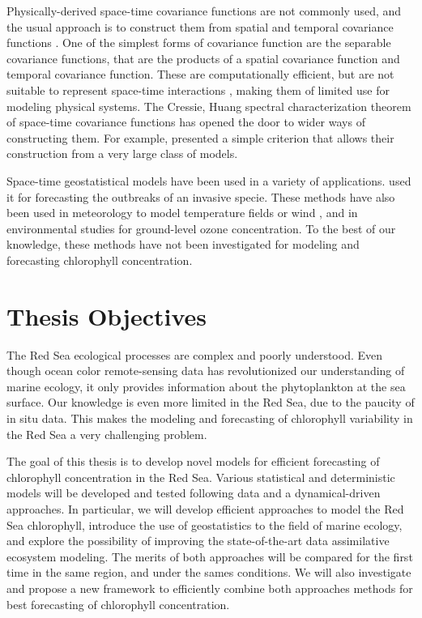 Physically-derived space-time covariance functions are not commonly used, and
the usual approach is to construct them from spatial and temporal covariance
functions \citep{Gneiting2010}. One of the simplest forms of covariance
function are the separable covariance functions, that are the products of a
spatial covariance function and temporal covariance function. These are
computationally efficient, but are not suitable to represent space-time
interactions \citep{Cressie1999, Stein2005}, making them of limited use for
modeling physical systems. The Cressie, Huang spectral characterization theorem
of space-time covariance functions has opened the door to wider ways of
constructing them. For example, \citet{Gneiting2002} presented a simple
criterion that allows their construction from a very large class of models. 

Space-time geostatistical models have been used in a variety of applications.
\citet{Hohn1993} used it for forecasting the outbreaks of an invasive specie.
These methods have also been used in meteorology to model temperature fields
\citep{Handcock1994, North2011} or wind \citep{Cressie1999, Gneiting2002}, and
in environmental studies for ground-level ozone concentration.  To the best
of our knowledge, these methods
have not been investigated for modeling and forecasting chlorophyll
concentration.

\section{Thesis Objectives}

The Red Sea ecological processes are complex and poorly
understood. Even though ocean color remote-sensing data has revolutionized our
understanding of marine ecology, it only provides information about the
phytoplankton at the sea surface. Our knowledge is even more limited in the Red
Sea, due to the paucity of in situ data. This makes the modeling and
forecasting of chlorophyll variability in the Red Sea a very challenging
problem.

The goal of this thesis is to develop novel models for efficient forecasting of
chlorophyll concentration in the Red Sea. Various statistical and deterministic
models will be developed and
tested following data and a dynamical-driven approaches. In particular, we will
develop efficient approaches to model the Red Sea chlorophyll,
introduce the use of geostatistics to the field of marine
ecology, and explore the
possibility of improving the state-of-the-art data assimilative ecosystem
modeling. The merits of both approaches will be compared for the first time in
the same region, and under the sames conditions. We will also 
investigate and propose a new framework to
efficiently combine both approaches methods for best forecasting of chlorophyll
concentration.

